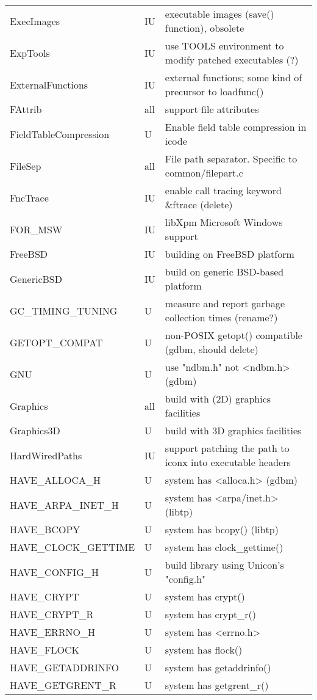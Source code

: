 \begin{xtabular}{|m{1.8in}|m{0.5in}|m{4.0in}|}
ExecImages & IU & executable images (save() function), obsolete \\
ExpTools & IU & use TOOLS environment to modify patched executables (?) \\
ExternalFunctions & IU & external functions; some kind of precursor to loadfunc() \\
FAttrib & all & support file attributes \\
FieldTableCompression & U & Enable field table compression in icode \\
FileSep & all & File path separator. Specific to common/filepart.c \\
FncTrace & IU & enable call tracing keyword \&ftrace (delete) \\
FOR\_MSW & IU & libXpm Microsoft Windows support \\
FreeBSD & IU & building on FreeBSD platform \\
GenericBSD & IU & build on generic BSD-based platform \\
GC\_TIMING\_TUNING & U & measure and report garbage collection times (rename?)\\
GETOPT\_COMPAT & U & non-POSIX getopt() compatible (gdbm, should delete) \\
GNU & U & use "ndbm.h" not <ndbm.h> (gdbm) \\
Graphics & all & build with (2D) graphics facilities \\
Graphics3D & U & build with 3D graphics facilities \\
HardWiredPaths & IU & support patching the path to iconx into executable headers \\
HAVE\_ALLOCA\_H & U & system has <alloca.h> (gdbm) \\
HAVE\_ARPA\_INET\_H & U & system has <arpa/inet.h> (libtp) \\
HAVE\_BCOPY & U & system has bcopy() (libtp) \\
HAVE\_CLOCK\_GETTIME & U & system has clock\_gettime() \\
HAVE\_CONFIG\_H & U & build library using Unicon's "config.h" \\
HAVE\_CRYPT & U & system has crypt() \\
HAVE\_CRYPT\_R & U & system has crypt\_r() \\
HAVE\_ERRNO\_H & U & system has <errno.h> \\
HAVE\_FLOCK & U & system has flock() \\
HAVE\_GETADDRINFO & U & system has getaddrinfo() \\
HAVE\_GETGRENT\_R & U & system has getgrent\_r() \\

\end{xtabular}
